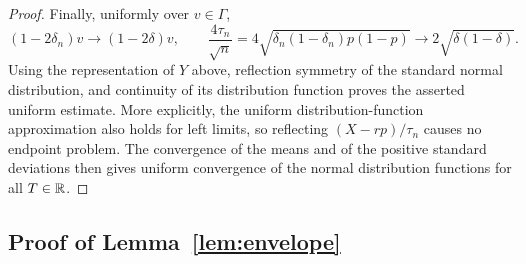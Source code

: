 \documentclass[11pt,reqno]{amsart}
\begin{document}
\begin{proof}
Finally, uniformly over $v\in\Gamma$,
\[
    (1-2\delta_n)v\longrightarrow(1-2\delta)v,
    \qquad
    \frac{4\tau_n}{\sqrt n}
    =4\sqrt{\delta_n(1-\delta_n)p(1-p)}
    \longrightarrow2\sqrt{\delta(1-\delta)}.
\]
Using the representation of $Y$ above, reflection symmetry of the
standard normal distribution, and continuity of its distribution
function proves the asserted uniform estimate. More explicitly,
the uniform distribution-function approximation also holds for
left limits, so reflecting $(X-rp)/\tau_n$ causes no endpoint
problem. The convergence of the means and of the positive standard
deviations then gives uniform convergence of the normal distribution
functions for all $T\in{\mathbb{R}}$.
\end{proof}

\subsection{Proof of Lemma~\ref{lem:envelope}}
\end{document}

